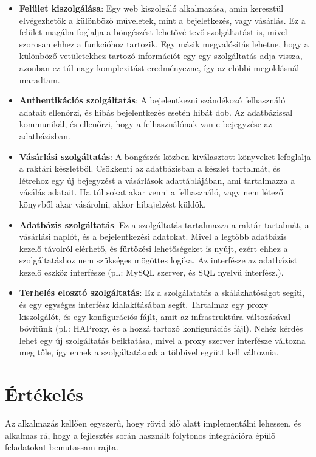 \documentclass[11pt,magyar,a4paper,twoside,]{report}
\providecommand{\tightlist}{%
  \setlength{\itemsep}{0pt}\setlength{\parskip}{0pt}}
\begin{document}
\begin{itemize}
\tightlist
\item
  \textbf{Felület kiszolgálása}: Egy web kiszolgáló alkalmazása, amin
  keresztül elvégezhetők a különböző műveletek, mint a bejeletkezés,
  vagy vásárlás. Ez a felület magába foglalja a böngészést lehetővé tevő
  szolgáltatást is, mivel szorosan ehhez a funkcióhoz tartozik. Egy
  másik megvalósítás lehetne, hogy a különböző vetületekhez tartozó
  információt egy-egy szolgáltatás adja vissza, azonban ez túl nagy
  komplexitást eredményezne, így az elöbbi megoldásnál maradtam.
\item
  \textbf{Authentikációs szolgáltatás}: A bejelentkezni szándékozó
  felhasználó adatait ellenőrzi, és hibás bejelentkezés esetén hibát
  dob. Az adatbázissal kommunikál, és ellenőrzi, hogy a felhasználónak
  van-e bejegyzése az adatbázisban.
\item
  \textbf{Vásárlási szolgáltatás}: A böngészés közben kiválasztott
  könyveket lefoglalja a raktári készletből. Csökkenti az adatbázisban a
  készlet tartalmát, és létrehoz egy új bejegyzést a vásárlások
  adattáblájában, ami tartalmazza a vásálás adatait. Ha túl sokat akar
  venni a felhasználó, vagy nem létező könyvből akar vásárolni, akkor
  hibajelzést küldök.
\item
  \textbf{Adatbázis szolgáltatás}: Ez a szolgáltatás tartalmazza a
  raktár tartalmát, a vásárlási naplót, és a bejelentkezési adatokat.
  Mivel a legtöbb adatbázis kezelő távolról elérhető, és fürtözési
  lehetőségeket is nyújt, ezért ehhez a szolgáltatáshoz nem szükséges
  mögöttes logika. Az interfésze az adatbázist kezelő eszköz interfésze
  (pl.: MySQL szerver, és SQL nyelvű interfész.).
\item
  \textbf{Terhelés elosztó szolgáltatás}: Ez a szolgálatatás a
  skálázhatóságot segíti, és egy egységes interfész kialakításában
  segít. Tartalmaz egy proxy kiszolgálót, és egy konfigurációs fájlt,
  amit az infrastruktúra változásával bővítünk (pl.: HAProxy, és a hozzá
  tartozó konfigurációs fájl). Nehéz kérdés lehet egy új szolgáltatás
  beiktatása, mivel a proxy szerver interfésze változna meg tőle, így
  ennek a szolgáltatásnak a többivel együtt kell változnia.
\end{itemize}

\section{Értékelés}\label{uxe9rtuxe9keluxe9s}

Az alkalmazás kellően egyszerű, hogy rövid idő alatt implementálni
lehessen, és alkalmas rá, hogy a fejlesztés során használt folytonos
integrációra épülő feladatokat bemutassam rajta.
\end{document}
